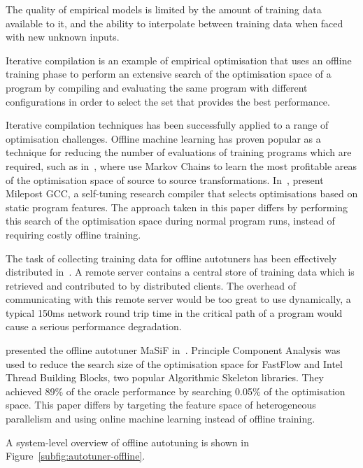 The quality of empirical models is limited by the amount of training
data available to it, and the ability to interpolate between training
data when faced with new unknown inputs.

Iterative compilation is an example of empirical optimisation that
uses an offline training phase to perform an extensive search of the
optimisation space of a program by compiling and evaluating the same
program with different configurations in order to select the set that
provides the best performance.

Iterative compilation techniques has been successfully applied to a
range of optimisation challenges. Offline machine learning has proven
popular as a technique for reducing the number of evaluations of
training programs which are required, such as in~\cite{Agakov}, where
\citeauthor{Agakov} use Markov Chains to learn the most profitable
areas of the optimisation space of source to source
transformations. In~\cite{Fursin2011}, \citeauthor{Fursin2011} present
Milepost GCC, a self-tuning research compiler that selects
optimisations based on static program features. The approach taken in
this paper differs by performing this search of the optimisation space
during normal program runs, instead of requiring costly offline
training.

The task of collecting training data for offline autotuners has been
effectively distributed in~\cite{Fursin2014, Auler2014}. A remote
server contains a central store of training data which is retrieved
and contributed to by distributed clients. The overhead of
communicating with this remote server would be too great to use
dynamically, a typical 150ms network round trip time in the critical
path of a program would cause a serious performance degradation.

\citeauthor{Collins2013} presented the offline autotuner MaSiF
in~\cite{Collins2013}. Principle Component Analysis was used to reduce
the search size of the optimisation space for FastFlow and Intel
Thread Building Blocks, two popular Algorithmic Skeleton
libraries. They achieved 89\% of the oracle performance by searching
0.05\% of the optimisation space. This paper differs by targeting the
feature space of heterogeneous parallelism and using online machine
learning instead of offline training.

A system-level overview of offline autotuning is shown in
Figure~\ref{subfig:autotuner-offline}.

